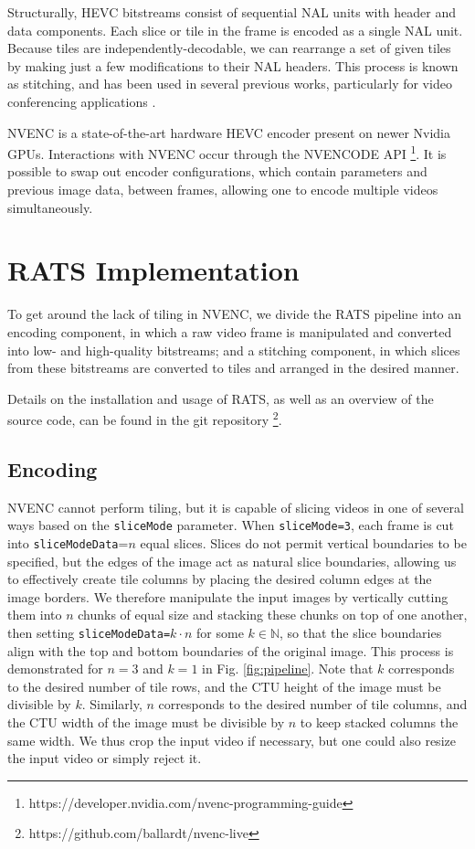 Structurally, HEVC bitstreams consist of sequential NAL units with header and data components. Each slice or tile in the frame is encoded as a single NAL unit. Because tiles are independently-decodable, we can rearrange a set of given tiles by making just a few modifications to their NAL headers. This process is known as stitching, and has been used in several previous works, particularly for video conferencing applications \cite{amon2012} \cite{feldmann2013} \cite{delafuente2017}.

NVENC is a state-of-the-art hardware HEVC encoder present on newer Nvidia GPUs. Interactions with NVENC occur through the NVENCODE API \footnote{https://developer.nvidia.com/nvenc-programming-guide}. It is possible to swap out encoder configurations, which contain parameters and previous image data, between frames, allowing one to encode multiple videos simultaneously.

\section{RATS Implementation} \label{rats}
To get around the lack of tiling in NVENC, we divide the RATS pipeline into an encoding component, in which a raw video frame is manipulated and converted into low- and high-quality bitstreams; and a stitching component, in which slices from these bitstreams are converted to tiles and arranged in the desired manner.

Details on the installation and usage of RATS, as well as an overview of the source code, can be found in the git repository \footnote{https://github.com/ballardt/nvenc-live}.

\subsection{Encoding}

NVENC cannot perform tiling, but it is capable of slicing videos in one of several ways based on the \texttt{sliceMode} parameter. When \texttt{sliceMode=3}, each frame is cut into \texttt{sliceModeData}=$n$ equal slices. Slices do not permit vertical boundaries to be specified, but the edges of the image act as natural slice boundaries, allowing us to effectively create tile columns by placing the desired column edges at the image borders. We therefore manipulate the input images by vertically cutting them into $n$ chunks of equal size and stacking these chunks on top of one another, then setting \texttt{sliceModeData=}$k \cdot n$ for some $k \in \mathbb{N}$, so that the slice boundaries align with the top and bottom boundaries of the original image. This process is demonstrated for $n=3$ and $k=1$ in Fig. \ref{fig:pipeline}. Note that $k$ corresponds to the desired number of tile rows, and the CTU height of the image must be divisible by $k$. Similarly, $n$ corresponds to the desired number of tile columns, and the CTU width of the image must be divisible by $n$ to keep stacked columns the same width. We thus crop the input video if necessary, but one could also resize the input video or simply reject it. 

